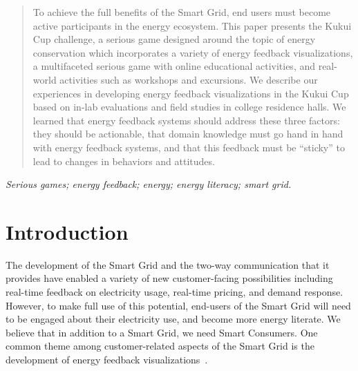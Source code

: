 \documentclass[10pt, conference, compsocconf]{IEEEtran-old}
\begin{document}
\begin{abstract}
To achieve the full benefits of the Smart Grid, end users must become active participants in the energy ecosystem. This paper presents the Kukui Cup challenge, a serious game designed around the topic of energy conservation which incorporates a variety of energy feedback visualizations, a multifaceted serious game with online educational activities, and real-world activities such as workshops and excursions. We describe our experiences in developing energy feedback visualizations in the Kukui Cup based on in-lab evaluations and field studies in college residence halls. We learned that energy feedback systems should address these three factors: they should be actionable, that domain knowledge must go hand in hand with energy feedback systems, and that this feedback must be ``sticky'' to lead to changes in behaviors and attitudes.
\end{abstract}

\begin{IEEEkeywords}
\emph{Serious games; energy feedback; energy; energy literacy; smart grid.}
\end{IEEEkeywords}


%
\IEEEpeerreviewmaketitle



\section{Introduction}

The development of the Smart Grid and the two-way communication that it provides have enabled a variety of new customer-facing possibilities including real-time feedback on electricity usage, real-time pricing, and demand response. However, to make full use of this potential, end-users of the Smart Grid will need to be engaged about their electricity use, and become more energy literate. We believe that in addition to a Smart Grid, we need Smart Consumers. One common theme among customer-related aspects of the Smart Grid is the development of energy feedback visualizations~\cite{csdl2-12-12}.
\end{document}
